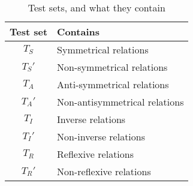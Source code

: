 \begin{table*}[htb]
\centering
\begin{minipage}{0.95\columnwidth}
\centering
\caption{Test sets, and what they contain}
\vspace{-3mm}

\begin{tabular}{c|l}\hline
Test set & Contains \\ \hline
$T_S$ & Symmetrical relations \\ 
$T_S'$ & Non-symmetrical relations \\ 
$T_A$ & Anti-symmetrical relations \\ 
$T_A'$ & Non-antisymmetrical relations \\ 
$T_I$ & Inverse relations \\ 
$T_I'$ & Non-inverse relations \\ 
$T_R$ & Reflexive relations \\ 
$T_R'$ & Non-reflexive relations \\ \hline
\end{tabular}

\label{tab:test_set_explanations}
\end{minipage}
\end{table*}

